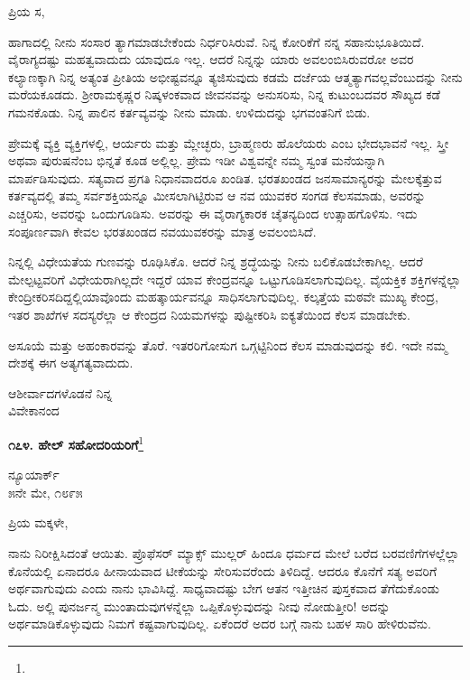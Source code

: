 \noindent
ಪ್ರಿಯ ಸ,

ಹಾಗಾದಲ್ಲಿ ನೀನು ಸಂಸಾರ ತ್ಯಾಗಮಾಡಬೇಕೆಂದು ನಿರ್ಧರಿಸಿರುವೆ. ನಿನ್ನ ಕೋರಿಕೆಗೆ ನನ್ನ ಸಹಾನುಭೂತಿಯಿದೆ. ವೈರಾಗ್ಯದಷ್ಟು ಮಹತ್ವವಾದುದು ಯಾವುದೂ ಇಲ್ಲ. ಆದರೆ ನಿನ್ನನ್ನು ಯಾರು ಅವಲಂಬಿಸಿರುವರೋ ಅವರ ಕಲ್ಯಾಣಕ್ಕಾಗಿ ನಿನ್ನ ಅತ್ಯಂತ ಪ್ರೀತಿಯ ಅಭೀಷ್ಟವನ್ನೂ ತ್ಯಜಿಸುವುದು ಕಡಮೆ ದರ್ಜೆಯ ಆತ್ಮತ್ಯಾಗವಲ್ಲವೆಂಬುದನ್ನು ನೀನು ಮರೆಯಕೂಡದು. ಶ‍್ರೀರಾಮಕೃಷ್ಣರ ನಿಷ್ಕಳಂಕವಾದ ಜೀವನವನ್ನು ಅನುಸರಿಸು, ನಿನ್ನ ಕುಟುಂಬದವರ ಸೌಖ್ಯದ ಕಡೆ ಗಮನಕೊಡು. ನಿನ್ನ ಪಾಲಿನ ಕರ್ತವ್ಯವನ್ನು ನೀನು ಮಾಡು. ಉಳಿದುದನ್ನು ಭಗವಂತನಿಗೆ ಬಿಡು.

ಪ್ರೇಮಕ್ಕೆ ವ್ಯಕ್ತಿ ವ್ಯಕ್ತಿಗಳಲ್ಲಿ, ಆರ್ಯರು ಮತ್ತು ಮ್ಲೇಚ್ಛರು, ಬ್ರಾಹ್ಮಣರು ಹೊಲೆಯರು ಎಂಬ ಭೇದಭಾವನೆ ಇಲ್ಲ. ಸ್ತ್ರೀ ಅಥವಾ ಪುರುಷನೆಂಬ ಭಿನ್ನತೆ ಕೂಡ ಅಲ್ಲಿಲ್ಲ. ಪ್ರೇಮ ಇಡೀ ವಿಶ್ವವನ್ನೇ ನಮ್ಮ ಸ್ವಂತ ಮನೆಯನ್ನಾಗಿ ಮಾರ್ಪಡಿಸುವುದು. ಸತ್ಯವಾದ ಪ್ರಗತಿ ನಿಧಾನವಾದರೂ ಖಂಡಿತ. ಭರತಖಂಡದ ಜನಸಾಮಾನ್ಯರನ್ನು ಮೇಲಕ್ಕೆತ್ತುವ ಕರ್ತವ್ಯದಲ್ಲಿ ತಮ್ಮ ಸರ್ವಶಕ್ತಿಯನ್ನೂ ಮೀಸಲಾಗಿಟ್ಟಿರುವ ಆ ನವ ಯುವಕರ ಸಂಗಡ ಕೆಲಸಮಾಡು, ಅವರನ್ನು ಎಚ್ಚರಿಸು, ಅವರನ್ನು ಒಂದುಗೂಡಿಸು. ಅವರನ್ನು ಈ ವೈರಾಗ್ಯಕಾರಕ ಚೈತನ್ಯದಿಂದ ಉತ್ಸಾಹಗೊಳಿಸು. ಇದು ಸಂಪೂರ್ಣವಾಗಿ ಕೇವಲ ಭರತಖಂಡದ ನವಯುವಕರನ್ನು ಮಾತ್ರ ಅವಲಂಬಿಸಿದೆ.

ನಿನ್ನಲ್ಲಿ ವಿಧೇಯತೆಯ ಗುಣವನ್ನು ರೂಢಿಸಿಕೊ. ಆದರೆ ನಿನ್ನ ಶ್ರದ್ಧೆಯನ್ನು ನೀನು ಬಲಿಕೊಡಬೇಕಾಗಿಲ್ಲ. ಆದರೆ ಮೇಲ್ಪಟ್ಟವರಿಗೆ ವಿಧೇಯರಾಗಿಲ್ಲದೇ ಇದ್ದರೆ ಯಾವ ಕೇಂದ್ರವನ್ನೂ ಒಟ್ಟುಗೂಡಿಸಲಾಗುವುದಿಲ್ಲ. ವೈಯಕ್ತಿಕ ಶಕ್ತಿಗಳನ್ನೆಲ್ಲಾ ಕೇಂದ್ರೀಕರಿಸದಿದ್ದಲ್ಲಿ\break ಯಾವೊಂದು ಮಹತ್ಕಾರ್ಯವನ್ನೂ ಸಾಧಿಸಲಾಗುವುದಿಲ್ಲ. ಕಲ್ಕತ್ತೆಯ ಮಠವೇ ಮುಖ್ಯ ಕೇಂದ್ರ, ಇತರ ಶಾಖೆಗಳ ಸದಸ್ಯರೆಲ್ಲಾ ಆ ಕೇಂದ್ರದ ನಿಯಮಗಳನ್ನು ಪುಷ್ಟೀಕರಿಸಿ ಐಕ್ಯತೆಯಿಂದ ಕೆಲಸ ಮಾಡಬೇಕು.

ಅಸೂಯೆ ಮತ್ತು ಅಹಂಕಾರವನ್ನು ತೊರೆ. ಇತರರಿಗೋಸುಗ ಒಗ್ಗಟ್ಟಿನಿಂದ ಕೆಲಸ ಮಾಡುವುದನ್ನು ಕಲಿ. ಇದೇ ನಮ್ಮ ದೇಶಕ್ಕೆ ಈಗ ಅತ್ಯಗತ್ಯವಾದುದು.

{\flushright
ಆಶೀರ್ವಾದಗಳೊಡನೆ ನಿನ್ನ\\ವಿವೇಕಾನಂದ\par}

\begin{center}
\textbf{೧೭೪. ಹೇಲ್ ಸಹೋದರಿಯರಿಗೆ}\footnote{}
\end{center}

\vspace{-0.5cm}

\begin{flushright}
ನ್ಯೂಯಾರ್ಕ್\\೫ನೇ ಮೇ, ೧೮೯೫
\end{flushright}

\vspace{-0.5cm}

\noindent
ಪ್ರಿಯ ಮಕ್ಕಳೇ,

ನಾನು ನಿರೀಕ್ಷಿಸಿದಂತೆ ಆಯಿತು. ಪ್ರೊಫೆಸರ್ ಮ್ಯಾಕ್ಸ್ ಮುಲ್ಲರ್ ಹಿಂದೂ ಧರ್ಮದ ಮೇಲೆ ಬರೆದ ಬರವಣಿಗೆಗಳಲ್ಲೆಲ್ಲಾ ಕೊನೆಯಲ್ಲಿ ಏನಾದರೂ ಹೀನಾಯವಾದ ಟೀಕೆಯನ್ನು ಸೇರಿಸುವರೆಂದು ತಿಳಿದಿದ್ದೆ. ಆದರೂ ಕೊನೆಗೆ ಸತ್ಯ ಅವರಿಗೆ ಅರ್ಥವಾಗುವುದು ಎಂದು ನಾನು ಭಾವಿಸಿದ್ದೆ. ಸಾಧ್ಯವಾದಷ್ಟು ಬೇಗ ಆತನ ಇತ್ತೀಚಿನ ಪುಸ್ತಕವಾದ  ತೆಗೆದುಕೊಂಡು ಓದು. ಅಲ್ಲಿ ಪುನರ್ಜನ್ಮ ಮುಂತಾದುವುಗಳನ್ನೆಲ್ಲಾ ಒಪ್ಪಿಕೊಳ್ಳುವುದನ್ನು ನೀವು ನೋಡುತ್ತೀರಿ! ಅದನ್ನು ಅರ್ಥಮಾಡಿಕೊಳ್ಳುವುದು ನಿಮಗೆ ಕಷ್ಟವಾಗುವುದಿಲ್ಲ. ಏಕೆಂದರೆ ಅದರ ಬಗ್ಗೆ ನಾನು ಬಹಳ ಸಾರಿ ಹೇಳಿರುವೆನು.

